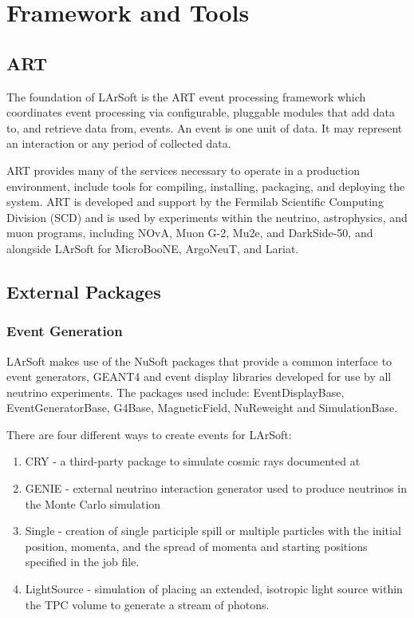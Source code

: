 \documentclass[12pt]{elsarticle}
\begin{document}
\section{Framework and Tools}
\subsection{ART}
The foundation of LArSoft is the ART event processing framework which coordinates event processing via configurable, pluggable modules that add data to, and retrieve data from, events.\cite{art-ref}  An event is one unit of data. It may represent an interaction or any period of collected data.

ART provides many of the services necessary to operate in a production environment, include tools for compiling, installing, packaging, and deploying the system.  ART is developed and support by the Fermilab Scientific Computing Division (SCD) and is used by experiments within the neutrino, astrophysics, and muon programs, including NOvA, Muon G-2, Mu2e, and DarkSide-50, and alongside LArSoft for MicroBooNE, ArgoNeuT, and Lariat.

\subsection{External Packages}
\subsubsection{Event Generation}
LArSoft makes use of the NuSoft packages that provide a common interface to event generators, GEANT4 and event display libraries developed for use by all neutrino experiments. The packages used include:    EventDisplayBase, EventGeneratorBase, G4Base, MagneticField, NuReweight and SimulationBase.

There are four different ways to create events for LArSoft:
\begin{enumerate}
\item{CRY - a third-party package to simulate cosmic rays documented at \cite{cry}}
\item{GENIE - external neutrino interaction generator used to produce neutrinos in the Monte Carlo simulation}
\item{Single - creation of single participle spill or multiple particles with the initial position, momenta, and the spread of momenta and starting positions specified in the job file.}
\item{LightSource - simulation of placing an extended, isotropic light source within the TPC volume to generate a stream of photons.}
\end{enumerate}
\end{document}
